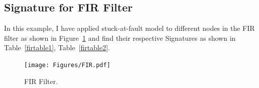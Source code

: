 \subsection{Signature for FIR Filter}


In this example, I have applied stuck-at-fault model to different nodes in the FIR filter as shown in Figure~\ref{fig:filter} and find their respective Signatures as shown in Table~\ref{firtable1}, Table~\ref{firtable2}.
%
%
%
%
%
%
%
%
%
%



\begin{figure}[tb!]
 \centering
  \captionsetup{justification=centering}    
   \texttt{[image: Figures/FIR.pdf]}
   \caption{FIR Filter.}
\label{fig:filter}
\end{figure}





